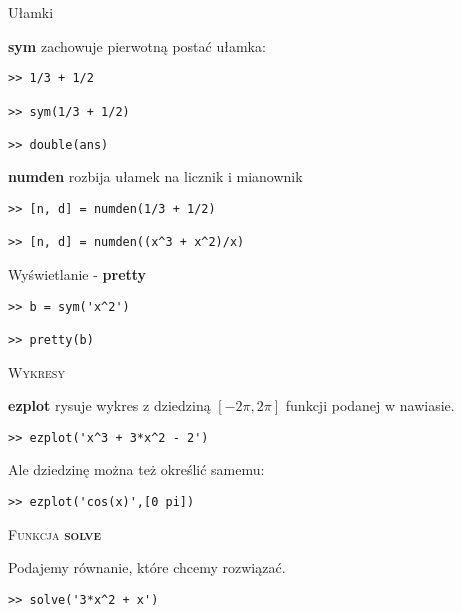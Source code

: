\documentclass[12pt]{amsbook}
\theoremstyle{definition}
\begin{document}
\begin{center}
Ułamki\\
\end{center}

\textbf{sym} zachowuje pierwotną postać ułamka:

\begin{lstlisting}
>> 1/3 + 1/2

>> sym(1/3 + 1/2)

>> double(ans)
\end{lstlisting}

\textbf{numden} rozbija ułamek na licznik i mianownik

\begin{lstlisting}
>> [n, d] = numden(1/3 + 1/2)

>> [n, d] = numden((x^3 + x^2)/x)

\end{lstlisting}

\begin{center}
Wyświetlanie - \textbf{pretty}\\
\end{center}

\begin{lstlisting}
>> b = sym('x^2')

>> pretty(b)
\end{lstlisting}


\begin{center}
\textsc{ Wykresy}\\
\end{center}

\textbf{ezplot} rysuje wykres z dziedziną $[-2 \pi, 2 \pi]$ funkcji podanej w nawiasie.

\begin{lstlisting}
>> ezplot('x^3 + 3*x^2 - 2')
\end{lstlisting}

Ale dziedzinę można też określić samemu:

\begin{lstlisting}
>> ezplot('cos(x)',[0 pi])
\end{lstlisting}


\begin{center}
\textsc{ Funkcja \textbf{solve}}\\
\end{center}

Podajemy równanie, które chcemy rozwiązać.

\begin{lstlisting}
>> solve('3*x^2 + x')
\end{lstlisting}
\end{document}

